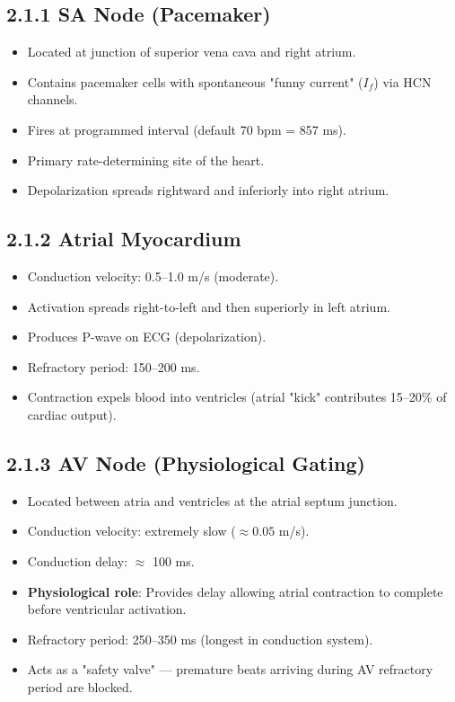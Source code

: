 \documentclass[12pt,oneside,a4paper]{book}
\begin{document}
\subsection{2.1.1 SA Node (Pacemaker)}

\begin{itemize}
  \item Located at junction of superior vena cava and right atrium.
  \item Contains pacemaker cells with spontaneous "funny current" ($I_f$) via HCN channels.
  \item Fires at programmed interval (default 70 bpm = 857 ms).
  \item Primary rate-determining site of the heart.
  \item Depolarization spreads rightward and inferiorly into right atrium.
\end{itemize}

\subsection{2.1.2 Atrial Myocardium}

\begin{itemize}
  \item Conduction velocity: 0.5--1.0 m/s (moderate).
  \item Activation spreads right-to-left and then superiorly in left atrium.
  \item Produces P-wave on ECG (depolarization).
  \item Refractory period: 150--200 ms.
  \item Contraction expels blood into ventricles (atrial "kick" contributes 15--20\% of cardiac output).
\end{itemize}

\subsection{2.1.3 AV Node (Physiological Gating)}

\begin{itemize}
  \item Located between atria and ventricles at the atrial septum junction.
  \item Conduction velocity: extremely slow (\(\approx 0.05\) m/s).
  \item Conduction delay: \(\approx\) 100 ms.
  \item \textbf{Physiological role}: Provides delay allowing atrial contraction to complete before ventricular activation.
  \item Refractory period: 250--350 ms (longest in conduction system).
  \item Acts as a "safety valve" — premature beats arriving during AV refractory period are blocked.
\end{itemize}
\end{document}
